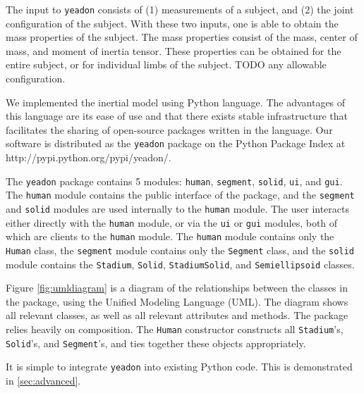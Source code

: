 \documentclass[10pt]{article}
\begin{document}
The input to \verb+yeadon+ consists of (1) measurements of a subject, and (2)
the joint configuration of the subject. With these two inputs, one is able to
obtain the mass properties of the subject.  The mass properties consist of the
mass, center of mass, and moment of inertia tensor. These properties can be
obtained for the entire subject, or for individual limbs of the subject. TODO
any allowable configuration.

We implemented the inertial model using Python language. The advantages of this
language
are its ease of use and that there exists stable infrastructure that
facilitates the sharing of open-source packages written in the language. Our
software is distributed as the \verb+yeadon+ package on the Python Package
Index at http://pypi.python.org/pypi/yeadon/.



The \verb+yeadon+ package contains 5 modules: \verb+human+, \verb+segment+,
\verb+solid+, \verb+ui+, and \verb+gui+. The \verb+human+ module contains the
public interface of the package, and the \verb+segment+ and \verb+solid+
modules are used internally to the \verb+human+ module. The user interacts
either directly with the \verb+human+ module, or via the \verb+ui+ or
\verb+gui+ modules, both of which are clients to the \verb+human+ module. The
\verb+human+ module contains only the \verb+Human+ class, the \verb+segment+
module contains only the \verb+Segment+ class, and the \verb+solid+ module
contains the \verb+Stadium+, \verb+Solid+, \verb+StadiumSolid+, and
\verb+Semiellipsoid+ classes. 

Figure \ref{fig:umldiagram} is a diagram of the
relationships between the classes in the package, using the Unified Modeling
Language (UML). The diagram shows all relevant classes, as well as all relevant
attributes and methods. The package relies heavily on composition. The
\verb+Human+ constructor constructs all \verb+Stadium+'s, \verb+Solid+'s, and
\verb+Segment+'s, and ties together these objects appropriately.


It is simple to integrate \verb+yeadon+ into existing Python code. This is
demonstrated in \ref{sec:advanced}.

\end{document}
